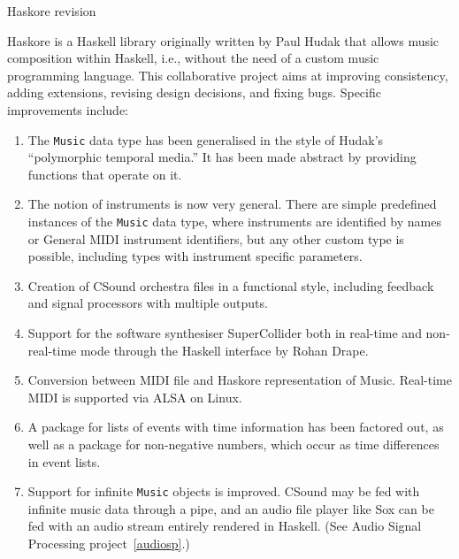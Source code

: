 \begin{hcarentry}[updated]{Haskore revision}
\label{haskore}
\makeheader

Haskore is a Haskell library originally written by Paul Hudak
that allows music composition within Haskell,
i.e., without the need of a custom music programming language.
This collaborative project aims at
improving consistency, adding extensions, revising design decisions,
and fixing bugs.
Specific improvements include:
\begin{enumerate}
\item The \texttt{Music} data type has been generalised in the style of
  Hudak's ``polymorphic temporal media.''
  It has been made abstract
  by providing functions that operate on it.

\item The notion of instruments is now very general.
  There are simple predefined instances of the \texttt{Music} data type,
  where instruments are identified by names or General MIDI instrument identifiers,
  but any other custom type is possible,
  including types with instrument specific parameters.

\item Creation of CSound orchestra files in a functional style,
  including feedback and signal processors with multiple outputs.

\item Support for the software synthesiser SuperCollider
  both in real-time and non-real-time mode
  through the Haskell interface by Rohan Drape.

\item Conversion between MIDI file and Haskore representation of Music.
  Real-time MIDI is supported via ALSA on Linux.

\item A package for lists of events with time information has been factored out,
  as well as a package for non-negative numbers,
  which occur as time differences in event lists.


\item Support for infinite \texttt{Music} objects is improved.
  CSound may be fed with infinite music data through a pipe, and
  an audio file player like Sox can be fed with an audio stream
  entirely rendered in Haskell.
  (See Audio Signal Processing project~\cref{audiosp}.)


\end{enumerate}
\end{hcarentry}
